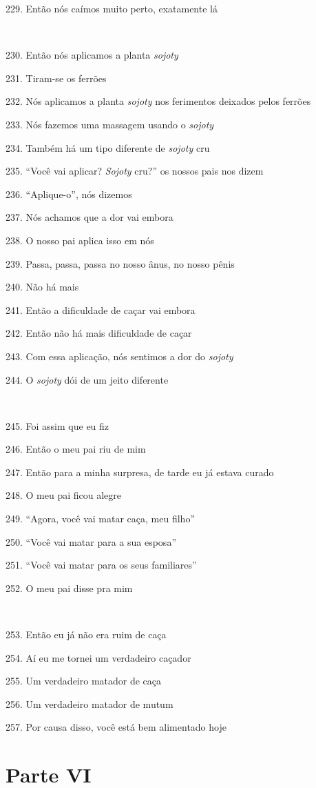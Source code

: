 229. Então nós caímos muito perto, exatamente lá

~

230. Então nós aplicamos a planta \emph{sojoty}

231. Tiram-se os ferrões

232. Nós aplicamos a planta \emph{sojoty} nos ferimentos deixados pelos
ferrões

233. Nós fazemos uma massagem usando o \emph{sojoty}

234. Também há um tipo diferente de \emph{sojoty} cru

235. ``Você vai aplicar? \emph{Sojoty} cru?'' os nossos pais nos dizem

236. ``Aplique-o'', nós dizemos

237. Nós achamos que a dor vai embora

238. O nosso pai aplica isso em nós

239. Passa, passa, passa no nosso ânus, no nosso pênis

240. Não há mais

241. Então a dificuldade de caçar vai embora

242. Então não há mais dificuldade de caçar

243. Com essa aplicação, nós sentimos a dor do \emph{sojoty}

244. O \emph{sojoty} dói de um jeito diferente

~

245. Foi assim que eu fiz

246. Então o meu pai riu de mim

247. Então para a minha surpresa, de tarde eu já estava curado

248. O meu pai ficou alegre

249. ``Agora, você vai matar caça, meu filho''

250. ``Você vai matar para a sua esposa''

251. ``Você vai matar para os seus familiares''

252. O meu pai disse pra mim

~

253. Então eu já não era ruim de caça

254. Aí eu me tornei um verdadeiro caçador

255. Um verdadeiro matador de caça

256. Um verdadeiro matador de mutum

257. Por causa disso, você está bem alimentado hoje

\section{Parte VI}

